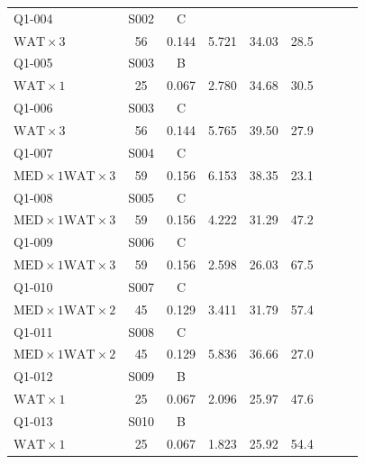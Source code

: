 \documentclass[bwprint,fontset=fandol]{gmcmthesis}
\begin{document}
\begin{longtable}{@{}lcclrrrrr@{}}
    Q1-004 & S002 & C & \shortstack[l]{\strut $\mathrm{FOD}\times 1$\quad $\mathrm{HYG}\times 1$\\\strut $\mathrm{WAT}\times 3$} & 56 & 0.144 & 5.721 & 34.03 & 28.5 \\[3pt]
    Q1-005 & S003 & B & \shortstack[l]{\strut $\mathrm{FOD}\times 1$\quad $\mathrm{MED}\times 1$\\\strut $\mathrm{WAT}\times 1$} & 25 & 0.067 & 2.780 & 34.68 & 30.5 \\[3pt]
    Q1-006 & S003 & C & \shortstack[l]{\strut $\mathrm{FOD}\times 1$\quad $\mathrm{HYG}\times 1$\\\strut $\mathrm{WAT}\times 3$} & 56 & 0.144 & 5.765 & 39.50 & 27.9 \\[3pt]
    Q1-007 & S004 & C & \shortstack[l]{\strut $\mathrm{FOD}\times 1$\quad $\mathrm{HYG}\times 1$\\\strut $\mathrm{MED}\times 1$\quad $\mathrm{WAT}\times 3$} & 59 & 0.156 & 6.153 & 38.35 & 23.1 \\[3pt]
    Q1-008 & S005 & C & \shortstack[l]{\strut $\mathrm{FOD}\times 1$\quad $\mathrm{HYG}\times 1$\\\strut $\mathrm{MED}\times 1$\quad $\mathrm{WAT}\times 3$} & 59 & 0.156 & 4.222 & 31.29 & 47.2 \\[3pt]
    Q1-009 & S006 & C & \shortstack[l]{\strut $\mathrm{FOD}\times 1$\quad $\mathrm{HYG}\times 1$\\\strut $\mathrm{MED}\times 1$\quad $\mathrm{WAT}\times 3$} & 59 & 0.156 & 2.598 & 26.03 & 67.5 \\[3pt]
    Q1-010 & S007 & C & \shortstack[l]{\strut $\mathrm{FOD}\times 1$\quad $\mathrm{HYG}\times 1$\\\strut $\mathrm{MED}\times 1$\quad $\mathrm{WAT}\times 2$} & 45 & 0.129 & 3.411 & 31.79 & 57.4 \\[3pt]
    Q1-011 & S008 & C & \shortstack[l]{\strut $\mathrm{FOD}\times 1$\quad $\mathrm{HYG}\times 1$\\\strut $\mathrm{MED}\times 1$\quad $\mathrm{WAT}\times 2$} & 45 & 0.129 & 5.836 & 36.66 & 27.0 \\[3pt]
    Q1-012 & S009 & B & \shortstack[l]{\strut $\mathrm{FOD}\times 1$\quad $\mathrm{MED}\times 1$\\\strut $\mathrm{WAT}\times 1$} & 25 & 0.067 & 2.096 & 25.97 & 47.6 \\[3pt]
    Q1-013 & S010 & B & \shortstack[l]{\strut $\mathrm{FOD}\times 1$\quad $\mathrm{MED}\times 1$\\\strut $\mathrm{WAT}\times 1$} & 25 & 0.067 & 1.823 & 25.92 & 54.4 \\[3pt]

\end{longtable}
\end{document}
